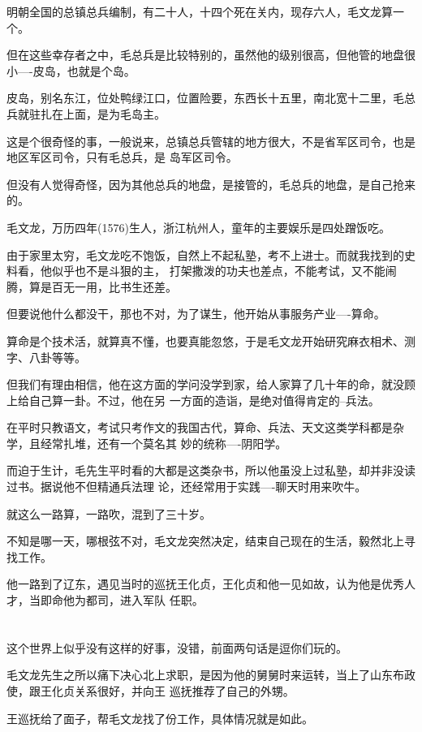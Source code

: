 \documentclass[11pt,a4paper,onecolumn]{article}
\begin{document}
明朝全国的总镇总兵编制，有二十人，十四个死在关内，现存六人，毛文龙算一个。

但在这些幸存者之中，毛总兵是比较特别的，虽然他的级别很高，但他管的地盘很小----皮岛，也就是个岛。

皮岛，别名东江，位处鸭绿江口，位置险要，东西长十五里，南北宽十二里，毛总兵就驻扎在上面，是为毛岛主。

这是个很奇怪的事，一般说来，总镇总兵管辖的地方很大，不是省军区司令，也是地区军区司令，只有毛总兵，是
岛军区司令。

但没有人觉得奇怪，因为其他总兵的地盘，是接管的，毛总兵的地盘，是自己抢来的。

毛文龙，万历四年(1576)生人，浙江杭州人，童年的主要娱乐是四处蹭饭吃。

由于家里太穷，毛文龙吃不饱饭，自然上不起私塾，考不上进士。而就我找到的史料看，他似乎也不是斗狠的主，
打架撒泼的功夫也差点，不能考试，又不能闹腾，算是百无一用，比书生还差。

但要说他什么都没干，那也不对，为了谋生，他开始从事服务产业----算命。

算命是个技术活，就算真不懂，也要真能忽悠，于是毛文龙开始研究麻衣相术、测字、八卦等等。

但我们有理由相信，他在这方面的学问没学到家，给人家算了几十年的命，就没顾上给自己算一卦。不过，他在另
一方面的造诣，是绝对值得肯定的--兵法。

在平时只教语文，考试只考作文的我国古代，算命、兵法、天文这类学科都是杂学，且经常扎堆，还有一个莫名其
妙的统称----阴阳学。

而迫于生计，毛先生平时看的大都是这类杂书，所以他虽没上过私塾，却并非没读过书。据说他不但精通兵法理
论，还经常用于实践----聊天时用来吹牛。

就这么一路算，一路吹，混到了三十岁。

不知是哪一天，哪根弦不对，毛文龙突然决定，结束自己现在的生活，毅然北上寻找工作。

他一路到了辽东，遇见当时的巡抚王化贞，王化贞和他一见如故，认为他是优秀人才，当即命他为都司，进入军队
任职。

\section[\thesection]{}

这个世界上似乎没有这样的好事，没错，前面两句话是逗你们玩的。

毛文龙先生之所以痛下决心北上求职，是因为他的舅舅时来运转，当上了山东布政使，跟王化贞关系很好，并向王
巡抚推荐了自己的外甥。

王巡抚给了面子，帮毛文龙找了份工作，具体情况就是如此。
\end{document}
